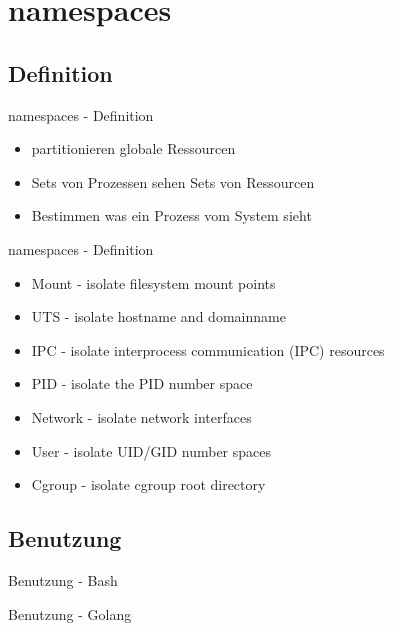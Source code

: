 \documentclass[14pt]{beamer}
\begin{document}
    \section{namespaces}
    \subsection{Definition}
    \begin{frame}{namespaces - Definition}
    \begin{itemize}
    \item partitionieren globale Ressourcen
    \item Sets von Prozessen sehen Sets von Ressourcen
    \item Bestimmen was ein Prozess vom System sieht
    \end{itemize}
    
    \end{frame}
    \begin{frame}{namespaces - Definition}
    \begin{itemize}
    \item Mount - isolate filesystem mount points
	\item UTS - isolate hostname and domainname
	\item IPC - isolate interprocess communication (IPC) resources
	\item PID - isolate the PID number space
	\item Network - isolate network interfaces
	\item User - isolate UID/GID number spaces
  	\item Cgroup - isolate cgroup root directory
    \end{itemize}
    \end{frame}
    
    \subsection{Benutzung}
    \begin{frame}{Benutzung - Bash}
    
    \end{frame}
    
    \begin{frame}{Benutzung - Golang}
    
    \end{frame}
    
\end{document}
